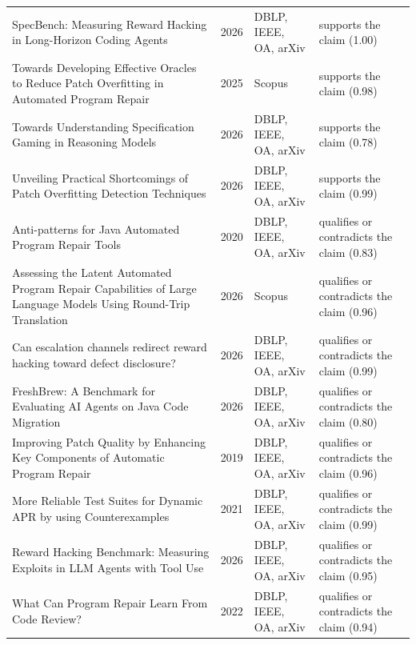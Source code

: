 \begin{longtable}{@{}%
  >{\raggedright\arraybackslash}p{}c%
  >{\raggedright\arraybackslash}p{}%
  >{\raggedright\arraybackslash}p{}@{}}
SpecBench: Measuring Reward Hacking in Long-Horizon Coding Agents & 2026 & DBLP, IEEE, OA, arXiv & supports the claim (1.00) \\
Towards Developing Effective Oracles to Reduce Patch Overfitting in Automated Program Repair & 2025 & Scopus & supports the claim (0.98) \\
Towards Understanding Specification Gaming in Reasoning Models & 2026 & DBLP, IEEE, OA, arXiv & supports the claim (0.78) \\
Unveiling Practical Shortcomings of Patch Overfitting Detection Techniques & 2026 & DBLP, IEEE, OA, arXiv & supports the claim (0.99) \\
Anti-patterns for Java Automated Program Repair Tools & 2020 & DBLP, IEEE, OA, arXiv & qualifies or contradicts the claim (0.83) \\
Assessing the Latent Automated Program Repair Capabilities of Large Language Models Using Round-Trip Translation & 2026 & Scopus & qualifies or contradicts the claim (0.96) \\
Can escalation channels redirect reward hacking toward defect disclosure? & 2026 & DBLP, IEEE, OA, arXiv & qualifies or contradicts the claim (0.99) \\
FreshBrew: A Benchmark for Evaluating AI Agents on Java Code Migration & 2026 & DBLP, IEEE, OA, arXiv & qualifies or contradicts the claim (0.80) \\
Improving Patch Quality by Enhancing Key Components of Automatic Program Repair & 2019 & DBLP, IEEE, OA, arXiv & qualifies or contradicts the claim (0.96) \\
More Reliable Test Suites for Dynamic APR by using Counterexamples & 2021 & DBLP, IEEE, OA, arXiv & qualifies or contradicts the claim (0.99) \\
Reward Hacking Benchmark: Measuring Exploits in LLM Agents with Tool Use & 2026 & DBLP, IEEE, OA, arXiv & qualifies or contradicts the claim (0.95) \\
What Can Program Repair Learn From Code Review? & 2022 & DBLP, IEEE, OA, arXiv & qualifies or contradicts the claim (0.94) \\
\end{longtable}
\endgroup

